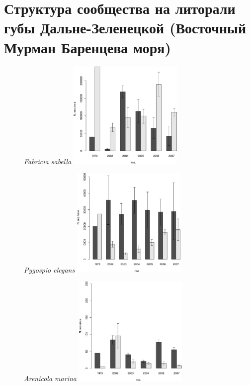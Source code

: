 \section{Структура сообщества на литорали губы Дальне-Зеленецкой (Восточный Мурман Баренцева моря)} 
\label{app:DZ_soobshestvo_dynamic}

	\begin{figure}[hp]
	
	\begin{minipage}[b]{.46\linewidth}
	\begin{center}
	{\footnotesize \textit{Fabricia sabella}}
		\includegraphics[width=55mm]{../after_Deryuginskie/2_disser/Fabricia_N_dynamic1.pdf}
	\end{center}
	\end{minipage}
	\hfil %
	\begin{minipage}[b]{.46\linewidth}
	\begin{center}
	{\footnotesize \textit{Pygospio elegans}}
		\includegraphics[width=55mm]{../after_Deryuginskie/2_disser/Pygospio_N_dynamic1.pdf}
	\end{center}
	\end{minipage}
	\begin{minipage}[b]{.46\linewidth}
	\begin{center}
	{\footnotesize \textit{Arenicola marina}}
	\includegraphics[width=55mm]{../after_Deryuginskie/2_disser/Arenicola_N_dynamic1.pdf}

\end{center}
\end{minipage}
\end{figure}
